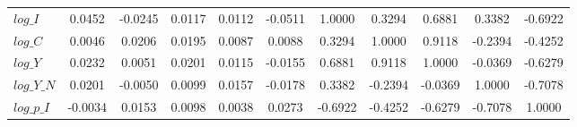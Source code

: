 \begin{center}
\begin{longtable}{lcccccccccc}
$log\_I          $	 & 	            0.0452	 & 	           -0.0245	 & 	            0.0117	 & 	            0.0112	 & 	           -0.0511	 & 	            1.0000	 & 	            0.3294	 & 	            0.6881	 & 	            0.3382	 & 	           -0.6922 \\ 
$log\_C          $	 & 	            0.0046	 & 	            0.0206	 & 	            0.0195	 & 	            0.0087	 & 	            0.0088	 & 	            0.3294	 & 	            1.0000	 & 	            0.9118	 & 	           -0.2394	 & 	           -0.4252 \\ 
$log\_Y          $	 & 	            0.0232	 & 	            0.0051	 & 	            0.0201	 & 	            0.0115	 & 	           -0.0155	 & 	            0.6881	 & 	            0.9118	 & 	            1.0000	 & 	           -0.0369	 & 	           -0.6279 \\ 
$log\_Y\_N       $	 & 	            0.0201	 & 	           -0.0050	 & 	            0.0099	 & 	            0.0157	 & 	           -0.0178	 & 	            0.3382	 & 	           -0.2394	 & 	           -0.0369	 & 	            1.0000	 & 	           -0.7078 \\ 
$log\_p\_I       $	 & 	           -0.0034	 & 	            0.0153	 & 	            0.0098	 & 	            0.0038	 & 	            0.0273	 & 	           -0.6922	 & 	           -0.4252	 & 	           -0.6279	 & 	           -0.7078	 & 	            1.0000 \\ 
\end{longtable}
 \end{center}

